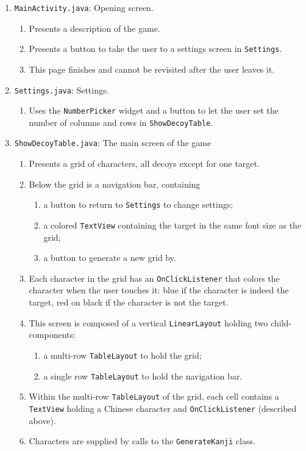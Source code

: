\documentclass[11pt,asymmetric]{article}
\begin{document}
\begin{enumerate}
\item \texttt{MainActivity.java}: Opening screen.\begin{enumerate}
	\item Presents a description of the game.
	\item Presents a button to take the user to a settings screen in \texttt{Settings}.
	\item This page finishes and cannot be revisited after the user leaves it.
	\end{enumerate}

\item \texttt{Settings.java}: Settings.\begin{enumerate}
	\item Uses the \texttt{NumberPicker} widget and a button to let the user set the number of columns and rows in \texttt{ShowDecoyTable}.
	\end{enumerate}
	
\item \texttt{ShowDecoyTable.java}: The main screen of the game\begin{enumerate}
	\item Presents a grid of characters, all decoys except for one target.
	\item Below the grid is a navigation bar, containing\begin{enumerate}
		\item a button to return to \texttt{Settings} to change settings;
		\item a colored \texttt{TextView} containing the target in the same font size as the grid;
		\item a button to generate a new grid by.
		\end{enumerate}
	\item Each character in the grid has an \texttt{OnClickListener} that colors the character when the user touches it: blue if the character is indeed the target, red on black if the character is not the target.
	\item This screen is composed of a vertical \texttt{LinearLayout} holding two child-components:\begin{enumerate}
		\item a multi-row \texttt{TableLayout} to hold the grid;
		\item a single row \texttt{TableLayout} to hold the navigation bar.
		\end{enumerate}
	\item Within the multi-row \texttt{TableLayout} of the grid, each cell contains a \texttt{TextView} holding a Chinese character and \texttt{OnClickListener} (described above).
	\item Characters are supplied by calls to the \texttt{GenerateKanji} class.


\end{enumerate}
\end{enumerate}
\end{document}
